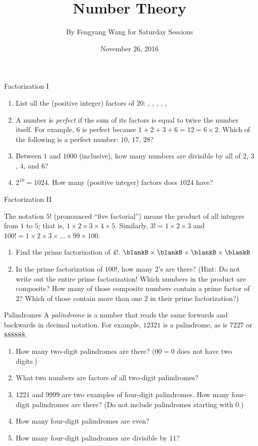 \documentclass[12pt,letterpaper]{article}
\title{Number Theory}
\author{By Fengyang Wang for Saturday Sessions}
\date{November 26, 2016}
\begin{document}
\HomeworkTitle
\begin{problem}{Factorization I}
  \begin{enumerate}
    \item
    List all the (positive integer) factors of \(20\):
   \blankB, \blankB,
   \blankB, \blankB,
   \blankB, \blankB
   \item
    A number is \emph{perfect} if the sum of its factors is equal to twice the
    number itself. For example, \(6\) is perfect because
    \(1+2+3+6=12=6\times2\). Which of the following is a perfect number:
    \(10\), \(17\), \(28\)?
   \item
   Between \(1\) and \(1000\) (inclusive), how many numbers are divisible by
   all of \(2\), \(3\), \(4\), and \(6\)? 
  \item \(2^{10}=1024\). How many (positive integer) factors does \(1024\)
  have?
 \end{enumerate}
\end{problem}

\begin{problem}{Factorization II}

The notation $5!$ (pronounced ``five factorial'') means the product of all
integers from $1$ to $5$; that is, $1 \times 2 \times 3 \times 4 \times 5$.
Similarly, $3! = 1 \times 2 \times 3$ and $100! = 1 \times 2 \times 3
\times\ldots\times 99 \times 100$.

\begin{enumerate}
 \item Find the prime factorization of $4!$. \hfill
 $\blankB \times \blankB \times \blankB \times \blankB$
 \item In the prime factorization of $100!$, how many $2$'s are there? (Hint:
 Do not write out the entire prime factorization! Which numbers in the product
 are composite? How many of those composite numbers contain a prime factor of
 $2$? Which of those contain more than one $2$ in their prime factorization?)
\end{enumerate}

\end{problem}

\begin{problem}{Palindromes}
 A \emph{palindrome} is a number that reads the same forwards and backwards in
 decimal notation. For example, $12321$ is a palindrome, as is $7227$ or
 $888888$.

 \begin{enumerate}
  \item How many two-digit palindromes are there? ($00=0$ does not have two
  digits.)
  \item What two numbers are factors of all two-digit palindromes?
  \item $1221$ and $9999$ are two examples of four-digit palindromes. How many
  four-digit palindromes are there? (Do not include palindromes starting with
  $0$.)
  \item How many four-digit palindromes are even?
  \item How many four-digit palindromes are divisible by $11$?
\end{enumerate}
\end{problem}
\end{document}
